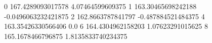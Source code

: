 0 167.4289093017578 4.07464599609375
1 163.30465698242188 -0.0496063232421875
2 162.8663787841797 -0.487884521484375
4 163.35426330566406 0.0
6 164.4304962158203 1.07623291015625
8 165.1678466796875 1.8135833740234375
